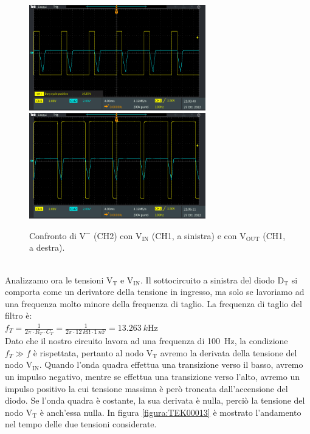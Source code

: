 \documentclass{report}
\begin{document}
\begin{figure}[h!]
	\centering
	\includegraphics[height=4.6cm]{immagini/TEK00004}
	\includegraphics[height=4.6cm]{immagini/TEK00005}
	\caption{Confronto di $\mathrm{V^-}$ (CH2) con $\mathrm{V_{IN}}$ (CH1, a sinistra) e con $\mathrm{V_{OUT}}$ (CH1, a destra).}
	\label{figura:TEK00004e5}
\end{figure}
\\Analizzamo ora le tensioni $\mathrm{V_T}$ e $\mathrm{V_{IN}}$. Il sottocircuito a sinistra del diodo $\mathrm{D_T}$ si comporta come un derivatore della tensione in ingresso, ma solo se lavoriamo ad una frequenza molto minore della frequenza di taglio. La frequenza di taglio del filtro è:
\\[4pt]\indent$\displaystyle{f_T = \frac{1}{2\pi\cdot R_T\cdot C_T} = \frac{1}{2\pi\cdot \SI{12}{k\ohm}\cdot\SI{1}{n\farad}} =\SI{13.263}{k\hertz}}$
\\[8pt]Dato che il nostro circuito lavora ad una frequenza di \SI{100}{\hertz}, la condizione $f_T\gg f$ è rispettata, pertanto al nodo $\mathrm{V_T}$ avremo la derivata della tensione del nodo $\mathrm{V_{IN}}$. Quando l'onda quadra effettua una transizione verso il basso, avremo un impulso negativo, mentre se effettua una transizione verso l'alto, avremo un impulso positivo la cui tensione massima è però troncata dall'accensione del diodo. Se l'onda quadra è costante, la sua derivata è nulla, perciò la tensione del nodo $\mathrm{V_T}$ è anch'essa nulla. In figura \ref{figura:TEK00013} è mostrato l'andamento nel tempo delle due tensioni considerate. 
\end{document}
